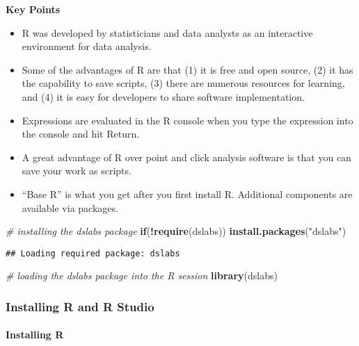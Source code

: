 \documentclass[
]{article}
\newenvironment{Shaded}{\begin{snugshade}}{\end{snugshade}}
\newcommand{\CommentTok}[1]{\textcolor[rgb]{0.56,0.35,0.01}{\textit{#1}}}
\newcommand{\ControlFlowTok}[1]{\textcolor[rgb]{0.13,0.29,0.53}{\textbf{#1}}}
\newcommand{\KeywordTok}[1]{\textcolor[rgb]{0.13,0.29,0.53}{\textbf{#1}}}
\newcommand{\NormalTok}[1]{#1}
\newcommand{\OperatorTok}[1]{\textcolor[rgb]{0.81,0.36,0.00}{\textbf{#1}}}
\newcommand{\StringTok}[1]{\textcolor[rgb]{0.31,0.60,0.02}{#1}}
\providecommand{\tightlist}{%
  \setlength{\itemsep}{0pt}\setlength{\parskip}{0pt}}
\begin{document}
\textbf{Key Points}

\begin{itemize}
\tightlist
\item
  R was developed by statisticians and data analysts as an interactive
  environment for data analysis.
\item
  Some of the advantages of R are that (1) it is free and open source,
  (2) it has the capability to save scripts, (3) there are numerous
  resources for learning, and (4) it is easy for developers to share
  software implementation.
\item
  Expressions are evaluated in the R console when you type the
  expression into the console and hit Return.
\item
  A great advantage of R over point and click analysis software is that
  you can save your work as scripts.
\item
  ``Base R'' is what you get after you first install R. Additional
  components are available via packages.
\end{itemize}

\begin{Shaded}
\begin{Highlighting}[]
\CommentTok{# installing the dslabs package}
\ControlFlowTok{if}\NormalTok{(}\OperatorTok{!}\KeywordTok{require}\NormalTok{(dslabs)) }\KeywordTok{install.packages}\NormalTok{(}\StringTok{"dslabs"}\NormalTok{)}
\end{Highlighting}
\end{Shaded}

\begin{verbatim}
## Loading required package: dslabs
\end{verbatim}

\begin{Shaded}
\begin{Highlighting}[]
\CommentTok{# loading the dslabs package into the R session}
\KeywordTok{library}\NormalTok{(dslabs)}
\end{Highlighting}
\end{Shaded}

\hypertarget{installing-r-and-r-studio}{%
\subsubsection{Installing R and R
Studio}\label{installing-r-and-r-studio}}

\hypertarget{installing-r}{%
\paragraph{Installing R}\label{installing-r}}
\end{document}
